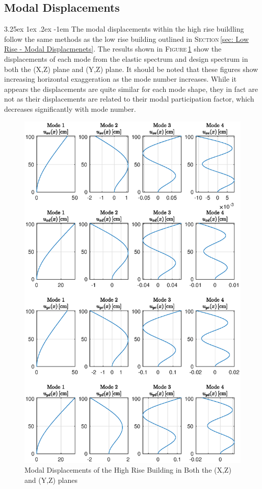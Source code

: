 \documentclass[11pt,a4paper,titlepage]{report}
\makeatletter
\renewcommand\paragraph{\@startsection{paragraph}{5}{\z@}%
  {3.25ex \@plus1ex \@minus.2ex}%
  {-1em}%
  {\normalfont\normalsize\bfseries}}
\makeatother
\begin{document}
\subsection{Modal Displacements}
\paragraph{}The modal displacements within the high rise buildling follow the same methods as the low rise building outlined in \textsc{Section}\,\ref{sec: Low Rise - Modal Displacmenets}. The results shown in \textsc{Figure}\,\ref{fig:I.2 Modal Displacements HR} show the displacements of each mode from the elastic spectrum and design spectrum in both the (X,Z) plane and (Y,Z) plane. It should be noted that these figures show increasing horizontal exaggeration as the mode number increases. While it appears the displacements are quite similar for each mode shape, they in fact are not as their displacements are related to their modal participation factor, which decreases significantly with mode number.
\begin{figure}
    \centering
    \includegraphics[width=15cm]{Modal_Displacements_HR.eps}
    \caption{Modal Displacements of the High Rise Building in Both the (X,Z) and (Y,Z) planes}
    \label{fig:I.2 Modal Displacements HR}
\end{figure}
\end{document}
